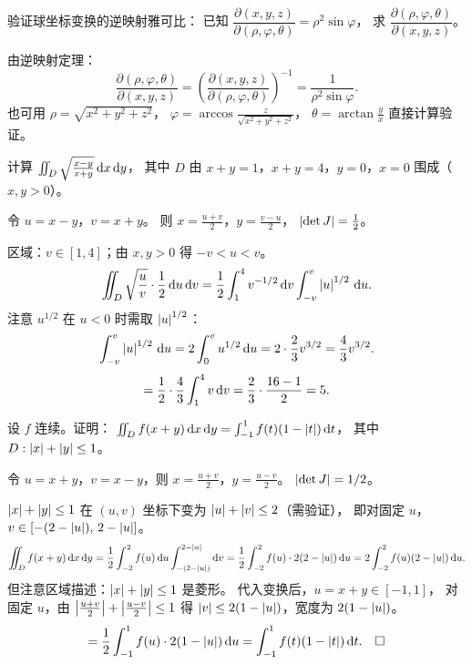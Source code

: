\documentclass{ctexart}
\begin{document}
\begin{exercise}[逆映射雅可比]
  验证球坐标变换的逆映射雅可比：
  已知 $\dfrac{\partial(x,y,z)}{\partial(\rho,\varphi,\theta)} = \rho^2\sin\varphi$，
  求 $\dfrac{\partial(\rho,\varphi,\theta)}{\partial(x,y,z)}$。
\end{exercise}

\begin{solution}
  由逆映射定理：
  \[
    \frac{\partial(\rho,\varphi,\theta)}{\partial(x,y,z)}
    = \left( \frac{\partial(x,y,z)}{\partial(\rho,\varphi,\theta)} \right)^{-1}
    = \frac{1}{\rho^2\sin\varphi}.
  \]
  也可用 $\rho = \sqrt{x^2+y^2+z^2}$，
  $\varphi = \arccos\frac{z}{\sqrt{x^2+y^2+z^2}}$，
  $\theta = \arctan\frac{y}{x}$ 直接计算验证。
\end{solution}

\begin{exercise}[综合——设计换元]
  计算 $\iint_D \sqrt{\frac{x-y}{x+y}} \,\mathrm{d} x\,\mathrm{d} y$，
  其中 $D$ 由 $x+y = 1$，$x+y = 4$，$y = 0$，$x = 0$ 围成（$x, y > 0$）。
\end{exercise}

\begin{solution}
  令 $u = x - y$，$v = x + y$。
  则 $x = \frac{u+v}{2}$，$y = \frac{v-u}{2}$，
  $\left| \det J \right| = \frac{1}{2}$。

  区域：$v \in [1,4]$；由 $x, y > 0$ 得 $-v < u < v$。
  \[
    \iint_D \sqrt{\frac{u}{v}} \cdot \frac{1}{2} \,\mathrm{d} u\,\mathrm{d} v
    = \frac{1}{2} \int_1^4 v^{-1/2} \,\mathrm{d} v \int_{-v}^{v} \left| u \right|^{1/2} \,\mathrm{d} u.
  \]
  注意 $u^{1/2}$ 在 $u < 0$ 时需取 $\left| u \right|^{1/2}$：
  \[
    \int_{-v}^v \left| u \right|^{1/2} \,\mathrm{d} u = 2 \int_0^v u^{1/2} \,\mathrm{d} u
    = 2 \cdot \frac{2}{3} v^{3/2} = \frac{4}{3} v^{3/2}.
  \]
  \[
    = \frac{1}{2} \cdot \frac{4}{3} \int_1^4 v \,\mathrm{d} v
    = \frac{2}{3} \cdot \frac{16-1}{2}
    = 5.
  \]
\end{solution}

\begin{exercise}
  设 $f$ 连续。证明：
  $\iint_D f(x+y) \,\mathrm{d} x\,\mathrm{d} y
  = \int_{-1}^1 f(t)(1-\left| t \right|) \,\mathrm{d} t$，
  其中 $D: \left| x \right|+\left| y \right| \le 1$。
\end{exercise}

\begin{solution}
  令 $u = x+y$，$v = x-y$，则 $x = \frac{u+v}{2}$，$y = \frac{u-v}{2}$。
  $\left| \det J \right| = 1/2$。

  $\left| x \right|+\left| y \right| \le 1$ 在 $(u,v)$ 坐标下变为 $\left| u \right|+\left| v \right| \le 2$（需验证），
  即对固定 $u$，$v \in [-(2-\left| u \right|),\, 2-\left| u \right|]$。
  \[
    \iint_D f(x+y) \,\mathrm{d} x\,\mathrm{d} y
    = \frac{1}{2} \int_{-2}^2 f(u) \,\mathrm{d} u \int_{-(2-\left| u \right|)}^{2-\left| u \right|} \mathrm{d} v
    = \frac{1}{2} \int_{-2}^2 f(u) \cdot 2(2-\left| u \right|) \,\mathrm{d} u
    = 2\int_{-2}^2 f(u)(2-\left| u \right|) \,\mathrm{d} u.
  \]
  但注意区域描述：$\left| x \right|+\left| y \right| \le 1$ 是菱形。
  代入变换后，$u = x+y \in [-1,1]$，
  对固定 $u$，由 $\left| \frac{u+v}{2} \right| + \left| \frac{u-v}{2} \right| \le 1$
  得 $\left| v \right| \le 2(1-\left| u \right|)$，宽度为 $2(1-\left| u \right|)$。
  \[
    = \frac{1}{2} \int_{-1}^1 f(u) \cdot 2(1-\left| u \right|) \,\mathrm{d} u
    = \int_{-1}^1 f(t)(1-\left| t \right|) \,\mathrm{d} t. \quad\square
  \]
\end{solution}
\end{document}
